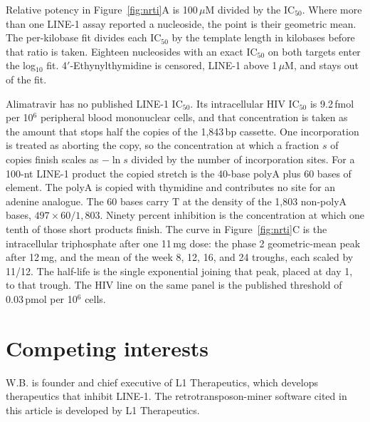 \documentclass[11pt,twocolumn,twoside]{extarticle}
\begin{document}
Relative potency in Figure~\ref{fig:nrti}A is 100\,$\mu$M divided by the IC$_{50}$. Where more than one LINE-1 assay reported a nucleoside, the point is their geometric mean. The per-kilobase fit divides each IC$_{50}$ by the template length in kilobases before that ratio is taken. Eighteen nucleosides with an exact IC$_{50}$ on both targets enter the log$_{10}$ fit. 4$'$-Ethynylthymidine is censored, LINE-1 above 1\,$\mu$M, and stays out of the fit.

Alimatravir has no published LINE-1 IC$_{50}$. Its intracellular HIV IC$_{50}$ is 9.2\,fmol per 10$^{6}$ peripheral blood mononuclear cells\cite{raheem}, and that concentration is taken as the amount that stops half the copies of the 1,843\,bp cassette. One incorporation is treated as aborting the copy, so the concentration at which a fraction $s$ of copies finish scales as $-\ln s$ divided by the number of incorporation sites. For a 100-nt LINE-1 product the copied stretch is the 40-base polyA plus 60 bases of element. The polyA is copied with thymidine and contributes no site for an adenine analogue. The 60 bases carry T at the density of the 1,803 non-polyA bases, $497 \times 60/1{,}803$. Ninety percent inhibition is the concentration at which one tenth of those short products finish. The curve in Figure~\ref{fig:nrti}C is the intracellular triphosphate after one 11\,mg dose: the phase 2 geometric-mean peak after 12\,mg, and the mean of the week 8, 12, 16, and 24 troughs, each scaled by 11/12\cite{mayer}. The half-life is the single exponential joining that peak, placed at day 1, to that trough. The HIV line on the same panel is the published threshold of 0.03\,pmol per 10$^{6}$ cells.

\section{Competing interests}
W.B. is founder and chief executive of L1 Therapeutics, which develops therapeutics that inhibit LINE-1. The retrotransposon-miner software cited in this article is developed by L1 Therapeutics.
\end{document}
